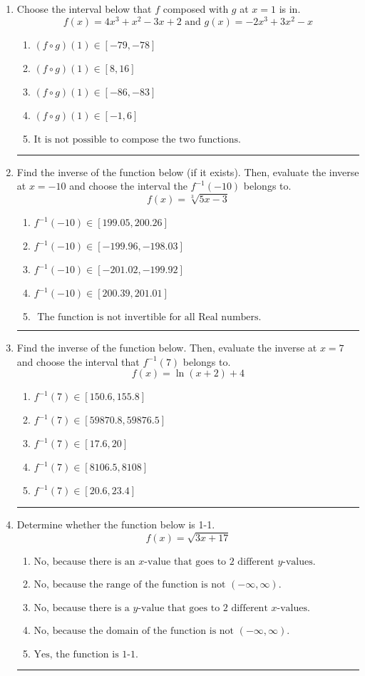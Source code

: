 \documentclass[14pt]{extbook}
\newcommand{\litem}[1]{\item#1\hspace*{-1cm}\rule{\textwidth}{0.4pt}}
\begin{document}
\begin{enumerate}
{\begin{enumerate}[label=\Alph*.]
\end{enumerate} }
\litem{
Choose the interval below that $f$ composed with $g$ at $x=1$ is in.\[ f(x) = 4x^{3} + x^{2} -3 x + 2 \text{ and } g(x) = -2x^{3} +3 x^{2} -x \]\begin{enumerate}[label=\Alph*.]
\item \( (f \circ g)(1) \in [-79, -78] \)
\item \( (f \circ g)(1) \in [8, 16] \)
\item \( (f \circ g)(1) \in [-86, -83] \)
\item \( (f \circ g)(1) \in [-1, 6] \)
\item \( \text{It is not possible to compose the two functions.} \)

\end{enumerate} }
\litem{
Find the inverse of the function below (if it exists). Then, evaluate the inverse at $x = -10$ and choose the interval the $f^{-1}(-10)$ belongs to.\[ f(x) = \sqrt[3]{5 x - 3} \]\begin{enumerate}[label=\Alph*.]
\item \( f^{-1}(-10) \in [199.05, 200.26] \)
\item \( f^{-1}(-10) \in [-199.96, -198.03] \)
\item \( f^{-1}(-10) \in [-201.02, -199.92] \)
\item \( f^{-1}(-10) \in [200.39, 201.01] \)
\item \( \text{ The function is not invertible for all Real numbers. } \)

\end{enumerate} }
\litem{
Find the inverse of the function below. Then, evaluate the inverse at $x = 7$ and choose the interval that $f^{-1}(7)$ belongs to.\[ f(x) = \ln{(x+2)}+4 \]\begin{enumerate}[label=\Alph*.]
\item \( f^{-1}(7) \in [150.6, 155.8] \)
\item \( f^{-1}(7) \in [59870.8, 59876.5] \)
\item \( f^{-1}(7) \in [17.6, 20] \)
\item \( f^{-1}(7) \in [8106.5, 8108] \)
\item \( f^{-1}(7) \in [20.6, 23.4] \)

\end{enumerate} }
\litem{
Determine whether the function below is 1-1.\[ f(x) = \sqrt{3 x + 17} \]\begin{enumerate}[label=\Alph*.]
\item \( \text{No, because there is an $x$-value that goes to 2 different $y$-values.} \)
\item \( \text{No, because the range of the function is not $(-\infty, \infty)$.} \)
\item \( \text{No, because there is a $y$-value that goes to 2 different $x$-values.} \)
\item \( \text{No, because the domain of the function is not $(-\infty, \infty)$.} \)
\item \( \text{Yes, the function is 1-1.} \)

\end{enumerate} }
\end{enumerate}
\end{document}
